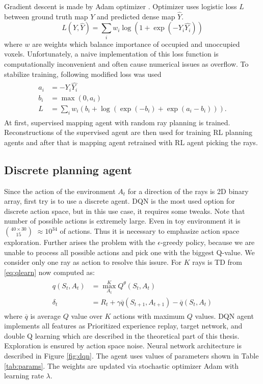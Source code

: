 Gradient descent is made by Adam optimizer \cite{adam2014}. Optimizer uses logistic loss $L$ between ground truth map $Y$ and predicted dense map $\hat{Y}$.
\begin{equation} \label{eq:loglos}
L(Y, \hat{Y}) = \sum\limits_i w_i \log(1 + \exp(-Y_i \hat{Y_i}))
\end{equation}
where $w$ are weights which balance importance of occupied and unoccupied voxels.
\pagebreak
Unfortunately, a naive implementation of this loss function is computationally inconvenient and often cause numerical issues as overflow. To stabilize training, following modified loss was used \cite{matconvnet2015}
\begin{align} 
\begin{split}
a_i &= -Y_i \hat{Y_i} \\
b_i &= \max(0, a_i) \\
L &= \sum\limits_i w_i (b_i + \log(\exp(-b_i) + \exp(a_i-b_i))).
\end{split}
\end{align}
At first, supervised mapping agent with random ray planning is trained. Reconstructions of the supervised agent are then used for training RL planning agents and after that is mapping agent retrained with RL agent picking the rays.
\subsection{Discrete planning agent}
Since the action of the environment $A_t$ for a direction of the rays is 2D binary array, first try is to use a discrete agent. DQN is the most used option for discrete action space, but in this use case, it requires some tweaks. Note that number of possible actions is extremely large. Even in toy environment it is $40\times30 \choose 15$ $\approx 10^{34}$ of actions. Thus it is necessary to emphasize action space exploration. Further arises the problem with the $\epsilon$-greedy policy, because we are unable to process all possible actions and pick one with the biggest Q-value. We consider only one ray as action to resolve this issure. For $K$ rays is TD from \eqref{eq:qlearn} now computed as:
\begin{align} \label{eq:dql}
\begin{split}
q(S_t, A_t) &= \max\limits_{A_t}^K Q^\theta(S_t, A_t)\\
\delta_t &= R_t + \gamma \overline{q}(S_{t+1}, A_{t+1}) - \overline{q}(S_t, A_t)
\end{split}
\end{align}
where $\overline{q}$ is average $Q$ value over $K$ actions with maximum $Q$ values. DQN agent implements all features as Prioritized experience replay, target network, and double Q learning which are described in the theoretical part of this thesis. Exploration is ensured by action space noise. Neural network architecture is described in Figure \ref{fig:dqn}. The agent uses values of parameters shown in Table \ref{tab:params}. The weights are updated via stochastic optimizer Adam with learning rate $\lambda$.

